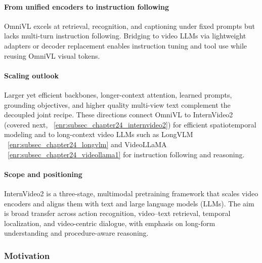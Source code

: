 \begin{enrichment}
\begin{enrichment}
        \paragraph{From unified encoders to instruction following}
        OmniVL excels at retrieval, recognition, and captioning under fixed prompts but lacks multi-turn instruction following.
        Bridging to video LLMs via lightweight adapters or decoder replacement enables instruction tuning and tool use while reusing OmniVL visual tokens.
        
        \paragraph{Scaling outlook}
        Larger yet efficient backbones, longer-context attention, learned prompts, grounding objectives, and higher quality multi-view text complement the decoupled joint recipe.
        These directions connect OmniVL to InternVideo2 (covered next, ~\ref{enr:subsec_chapter24_internvideo2}) for efficient spatiotemporal modeling and to long-context video LLMs such as LongVLM ~\ref{enr:subsec_chapter24_longvlm} and VideoLLaMA ~\ref{enr:subsec_chapter24_videollama1} for instruction following and reasoning.
        
    \end{enrichment}
    
    \newpage
    
    \begin{enrichment}
        \label{enr:subsec_chapter24_internvideo2}
        
        \paragraph{Scope and positioning}
        InternVideo2 \cite{wang2024_internvideo2} is a three-stage, multimodal pretraining framework that scales video encoders and aligns them with text and large language models (LLMs). The aim is broad transfer across action recognition, video–text retrieval, temporal localization, and video-centric dialogue, with emphasis on long-form understanding and procedure-aware reasoning.
        
        \subsubsection{Motivation}
        \label{subsubsec:chapter24_internvideo2_motivation}
        

\end{enrichment}
\end{enrichment}
